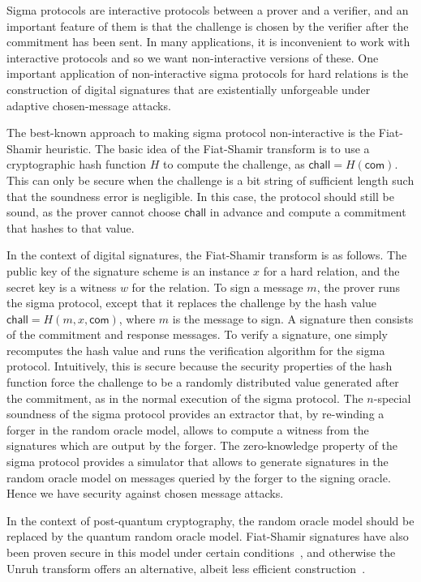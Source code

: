 \documentclass{llncs}
\newcommand{\com}{\mathsf{com}}
\newcommand{\chall}{\mathsf{chall}}
\newcommand{\develop}[1]{{\color{blue}#1}}
\begin{document}
Sigma protocols are interactive protocols between a prover and a verifier, and an important feature of them is that the challenge is chosen by the verifier after the commitment has been sent. In many applications, it is inconvenient to work with interactive protocols and so we want non-interactive versions of these.
One important application of non-interactive sigma protocols for hard relations is the construction of digital signatures that are existentially unforgeable under adaptive chosen-message attacks.

The best-known approach to making sigma protocol non-interactive is the Fiat-Shamir heuristic.
The basic idea of the Fiat-Shamir transform is to use a cryptographic hash function $H$ to compute the challenge, as $\chall  = H(\com)$. This can only be secure when the challenge is a bit string of sufficient length such that the soundness error is negligible. In this case, the protocol should still be sound, as the prover cannot choose $\chall$ in advance and compute a commitment that hashes to that value.

In the context of digital signatures, the Fiat-Shamir transform is as follows.
The public key of the signature scheme is an instance $x$ for a hard relation, and the secret key is a witness $w$ for the relation. To sign a message $m$, the prover runs the sigma protocol, except that it replaces the challenge by the hash value $\chall = H(m,x,\com)$, where $m$ is the message to sign.
A signature then consists of the commitment and response messages. To verify a signature, one simply recomputes the hash value and runs the verification algorithm for the sigma protocol. Intuitively, this is secure because the security properties of the hash function force the challenge to be a randomly distributed value generated after the commitment, as in the normal execution of the sigma protocol.
The $n$-special soundness of the sigma protocol provides an extractor that, by re-winding a forger in the random oracle model, allows to compute a witness from the signatures which are output by the forger.
The zero-knowledge property of the sigma protocol provides a simulator that allows to generate signatures in the random oracle model on messages queried by the forger to the signing oracle. Hence we have security against chosen message attacks.


In the context of post-quantum cryptography, the random oracle model should be replaced by the {quantum} random oracle model. 
%
Fiat-Shamir signatures have also been proven secure in this model under certain conditions~\cite{KLS18}, and otherwise the Unruh transform offers an alternative, albeit less efficient construction~\cite{Unruh15}. 
\end{document}
